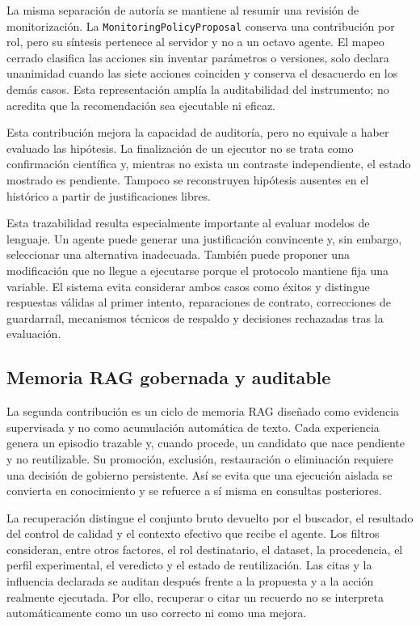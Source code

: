 La misma separación de autoría se mantiene al resumir una revisión de
monitorización. La \texttt{MonitoringPolicyProposal} conserva una contribución
por rol, pero su síntesis pertenece al servidor y no a un octavo agente. El
mapeo cerrado clasifica las acciones sin inventar parámetros o versiones, solo
declara unanimidad cuando las siete acciones coinciden y conserva el desacuerdo
en los demás casos. Esta representación amplía la auditabilidad del instrumento;
no acredita que la recomendación sea ejecutable ni eficaz.

Esta contribución mejora la capacidad de auditoría, pero no equivale a haber
evaluado las hipótesis. La finalización de un ejecutor no se trata como
confirmación científica y, mientras no exista un contraste independiente, el
estado mostrado es pendiente. Tampoco se reconstruyen hipótesis ausentes en el
histórico a partir de justificaciones libres.

Esta trazabilidad resulta especialmente importante al evaluar modelos de
lenguaje. Un agente puede generar una justificación convincente y, sin embargo,
seleccionar una alternativa inadecuada. También puede proponer una modificación
que no llegue a ejecutarse porque el protocolo mantiene fija una variable. El
sistema evita considerar ambos casos como éxitos y distingue respuestas válidas
al primer intento, reparaciones de contrato, correcciones de guardarraíl,
mecanismos técnicos de respaldo y decisiones rechazadas tras la evaluación.

\subsection{Memoria RAG gobernada y auditable}

La segunda contribución es un ciclo de memoria RAG diseñado como evidencia
supervisada y no como acumulación automática de texto. Cada experiencia genera
un episodio trazable y, cuando procede, un candidato que nace pendiente y no
reutilizable. Su promoción, exclusión, restauración o eliminación requiere una
decisión de gobierno persistente. Así se evita que una ejecución aislada se
convierta en conocimiento y se refuerce a sí misma en consultas posteriores.

La recuperación distingue el conjunto bruto devuelto por el buscador, el
resultado del control de calidad y el contexto efectivo que recibe el agente.
Los filtros consideran, entre otros factores, el rol destinatario, el dataset,
la procedencia, el perfil experimental, el veredicto y el estado de
reutilización. Las citas y la influencia declarada se auditan después frente a
la propuesta y a la acción realmente ejecutada. Por ello, recuperar o citar un
recuerdo no se interpreta automáticamente como un uso correcto ni como una
mejora.

